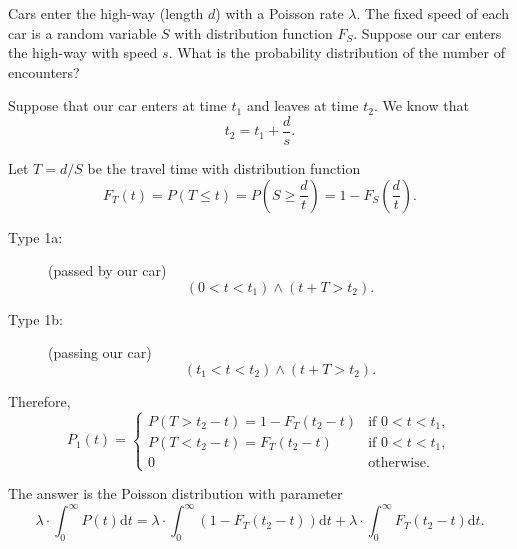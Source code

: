 \begin{example}
Cars enter the high-way (length $ d $) with a Poisson rate $ \lambda $. The fixed speed of each car is a random variable $ S $ with distribution function $ F_{S} $. Suppose our car enters the high-way with speed $ s $. What is the probability distribution of the number of encounters?

Suppose that our car enters at time $ t_{1} $ and leaves at time $ t_{2} $. We know that
\[ t_{2} = t_{1} + \frac{d}{s}. \]

Let $ T = d / S $ be the travel time with distribution function
\[ F_{T}(t) = P(T \le t) = P \left( S \ge \frac{d}{t} \right) = 1 - F_{S} \left( \frac{d}{t} \right). \]

\begin{description}
  \item[Type 1a:] (passed by our car) \\
    \[ (0 < t < t_{1}) \wedge (t + T > t_{2}). \]
  \item[Type 1b:] (passing our car) \\
    \[ (t_{1} < t < t_{2}) \wedge (t + T > t_{2}). \]
\end{description}

Therefore,
\[ P_{1}(t) =
  \begin{cases}
    P(T > t_{2} - t) = 1 - F_{T}(t_{2} - t)   & \text{if } 0 < t < t_{1}, \\
    P(T < t_{2} - t) = F_{T}(t_{2} - t)       & \text{if } 0 < t < t_{1}, \\
    0                                         & \text{otherwise}.
  \end{cases} \]

The answer is the Poisson distribution with parameter
\[ \lambda \cdot \int_{0}^{\infty} P(t) \mathrm{d}t = \lambda \cdot \int_{0}^{\infty} (1 - F_{T}(t_{2} - t)) \mathrm{d}t + \lambda \cdot \int_{0}^{\infty} F_{T}(t_{2} - t) \mathrm{d}t. \]
\end{example}

